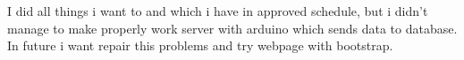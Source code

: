 I did all things i want to and which i have in approved schedule, but i didn't manage to make properly work server with arduino which sends data to database. In future i want repair this problems and try webpage with bootstrap.